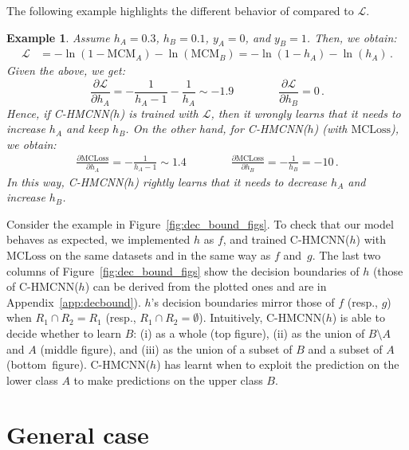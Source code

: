 \documentclass{article}
\newcommand{\lss}{\mathcal{L}}
\newcommand{\module}{\text{MCM}}
\newcommand{\loss}{\text{MCLoss}}
\newcommand{\system}[1]{C-HMCNN(#1)}
\newtheorem{example}[theorem]{Example}
\begin{document}
The following example highlights the different behavior of {\loss} compared to $\lss$.

\begin{example}{\rm 
Assume $h_A = 0.3$, $h_B = 0.1$, $y_A = 0$, and $y_B = 1$. 
Then, we obtain: 
\begin{align*}
\lss & = - \ln(1-\module_A) - \ln(\module_B)  = -\ln(1-h_A) - \ln(h_A)\,. 
\end{align*}
Given the above, we get:
$$
\frac{\partial \lss}{\partial h_A} = -\frac{1}{h_A-1} - \frac{1}{h_A} \sim -1.9\qquad \qquad  \frac{\partial \lss}{\partial h_B} = 0\,.
$$
Hence, if \system{$h$} is trained with $\lss$, then it wrongly learns that it needs to increase $h_A$ and keep $h_B$. On the other hand, for \system{$h$} (with $\loss$), we obtain:
\begin{align*}
\frac{\partial \loss}{\partial h_A} = -\frac{1}{h_A-1} \sim 1.4 \qquad \qquad \frac{\partial \loss}{\partial h_B} = -\frac{1}{h_B} = - 10\,.
\end{align*}
In this way, \system{$h$} rightly learns that it needs to decrease $h_A$ and increase $h_B$.
}\end{example}








Consider the example in Figure~\ref{fig:dec_bound_figs}. To check that our model behaves as expected, we implemented $h$ as $f$, and trained \system{$h$} with $\loss$ on the same datasets and in the same way as $f$ and~$g$. 
The last two columns of Figure~\ref{fig:dec_bound_figs} show the decision boundaries of $h$ (those of \system{$h$} can be derived from the plotted ones and are in Appendix~\ref{app:decbound}). 
$h$'s decision boundaries mirror those of $f$ (resp., $g$) when 
$R_1 \cap R_2 = R_1$ (resp., $R_1 \cap R_2 = \emptyset$). Intuitively,
\system{$h$} is able to decide whether to learn $B$: (i) as a whole (top figure), (ii) as the union of $B\setminus A$ and $A$ (middle figure), and (iii) as the union of a subset of $B$ and a subset of $A$ (bottom~figure). \system{$h$} has learnt when to exploit the prediction on the lower class $A$ to make predictions on the upper class $B$.












\section{General case}\label{sec:main}
\end{document}
